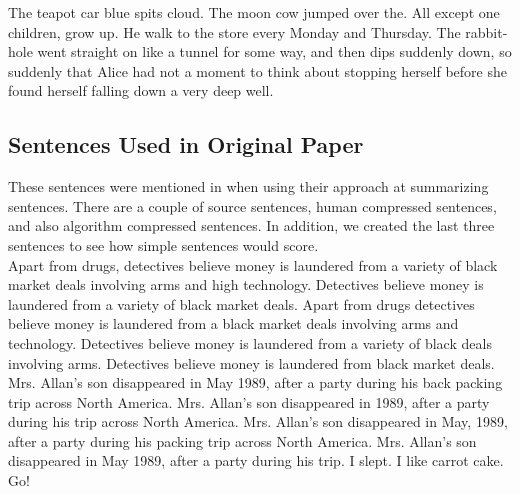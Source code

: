 \documentclass[11pt,a4paper]{article}
\begin{document}
The teapot car blue spits cloud.
The moon cow jumped over the.
All except one children, grow up.
He walk to the store every Monday and Thursday.
The rabbit-hole went straight on like a tunnel for some way, and then
dips suddenly down, so suddenly that Alice had not a moment to think
about stopping herself before she found herself falling down a very deep
well.

\subsection{Sentences Used in Original Paper}
These sentences were mentioned in \cite{li2014} when using their approach at summarizing sentences. There are a couple of source sentences, human compressed sentences, and also algorithm compressed sentences. In addition, we created the last three sentences to see how simple sentences would score.\\

Apart from drugs, detectives believe money is laundered from a variety of black market deals involving arms and high technology.
Detectives believe money is laundered from a variety of black market deals.
Apart from drugs detectives believe money is laundered from a black market deals involving arms and technology.
Detectives believe money is laundered from a variety of black deals involving arms.
Detectives believe money is laundered from black market deals.
Mrs. Allan's son disappeared in May 1989, after a party during his back packing trip across North America.
Mrs. Allan's son disappeared in 1989, after a party during his trip across North America.
Mrs. Allan's son disappeared in May, 1989, after a party during his packing trip across North America.
Mrs. Allan's son disappeared in May 1989, after a party during his trip.
I slept.
I like carrot cake.
Go!
\end{document}
